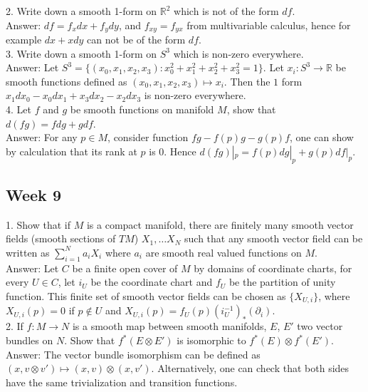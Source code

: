 \documentclass{article}
\theoremstyle{definition}
\begin{document}
2. Write down a smooth 1-form on $\mathbb{R}^2$ which is not of the form $df$.\\

Answer: $df=f_xdx+f_ydy$, and $f_{xy}=f_{yx}$ from multivariable calculus, hence for example $dx+xdy$ can not be of the form $df$.\\

3. Write down a smooth 1-form on $S^3$ which is non-zero everywhere.\\

Answer: Let $S^3=\{(x_0, x_1, x_2, x_3): x_0^2+x_1^2+x_2^2+x_3^2=1\}$. Let $x_i: S^3\rightarrow \mathbb{R}$ be smooth functions defined as $(x_0, x_1, x_2, x_3)\mapsto x_i$. Then the $1$ form $x_1dx_0-x_0dx_1+x_3dx_2-x_2dx_3$ is non-zero everywhere.\\

4. Let $f$ and $g$ be smooth functions on manifold $M$, show that $d(fg)=fdg+gdf$.\\

Answer: For any $p\in M$, consider function $fg-f(p)g-g(p)f$, one can show by calculation that its rank at $p$ is $0$. Hence $d(fg)|_p=f(p)dg|_p+g(p)df|_p$.

\newpage

\subsection{Week 9}

1. Show that if $M$ is a compact manifold, there are finitely many smooth vector fields (smooth sections of $TM$) $X_1, \dots X_N$ such that any smooth vector field can be written as $\sum_{i=1}^Na_iX_i$ where $a_i$ are smooth real valued functions on $M$.\\

Answer: Let $C$ be a finite open cover of $M$ by domains of coordinate charts, for every $U\in C$, let $i_U$ be the coordinate chart and $f_U$ be the partition of unity function. This finite set of smooth vector fields can be chosen as $\{X_{U, i}\}$, where $X_{U, i}(p)=0$ if $p\not\in U$ and $X_{U, i}(p)=f_U(p)(i_U^{-1})_*(\partial_i)$.\\

2. If $f: M\rightarrow N$ is a smooth map between smooth manifolds, $E$, $E'$ two vector bundles on $N$. Show that $f^*(E\otimes E')$ is isomorphic to $f^*(E)\otimes f^*(E')$.\\

Answer: The vector bundle isomorphism can be defined as $(x, v\otimes v')\mapsto (x, v)\otimes (x, v')$. Alternatively, one can check that both sides have the same trivialization and transition functions.\\
\end{document}
